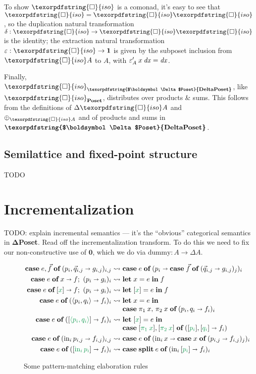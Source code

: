 \documentclass{rntz}\usepackage[a5]{rntzgeometry}\usepackage[fullwidth=130mm,width=330pt,]{narrow}
\newcommand\mathvar[1]{\ensuremath{#1}} %
\renewcommand\mathvar[1]{\ensuremath{\mathit{#1}}} %
\newcommand\todo[1]{{\color{ACMRed}#1}}
\newcommand\isocolor{\color{ForestGreen}} %
\newcommand\cat\textbf
\newcommand\CP{\cat{\texorpdfstring{$\boldsymbol\Delta$Poset}{DeltaPoset}}}
\newcommand\Poset{\cat{Poset}}
\newcommand\D\Delta
\newcommand\injc{\text{in}}
\newcommand\inj[1]{\injc_{#1}\,}
\newcommand\zero{\ensuremath{\mathbold{0}}}
\newcommand\<{\mskip 4mu plus 4mu minus 1mu}
\newcommand\dx{\mathvar{dx}}
\newcommand\iso{{\texorpdfstring{\ensuremath{\square}}{iso}}}
\newcommand\isof{\iso}
\newcommand\fname\text
\newcommand\chgs[1]{\D{#1}}
\newcommand\deriv[1]{\ensuremath{#1'}}
\newcommand\upd{\mathbin{\oplus}}
\newcommand\updfn{\ensuremath{{\upd}}}
\newcommand\kwname\textbf
\newcommand\ecase[1]{\kwname{case} \;{#1}\; \kwname{of}\;}
\newcommand\caseto\shortrightarrow
\newcommand\ebox[1]{[{#1}]}
\newcommand\elet[1]{\kwname{let}\;#1\;\kwname{in}\;}
\newcommand\eboxd[1]{\ebox{\isocolor #1}}
\newcommand\etuple[1]{\langle{#1}\rangle}
\newcommand\splitsum{\kwname{split}\<}
\begin{document}
\noindent
To show $\iso$ is a comonad, it's easy to see that ${\iso} = {\iso\iso}$, so the
duplication natural transformation $\delta : {\iso} \to {\iso\iso}$ is the
identity; the extraction natural transformation $\varepsilon : {\iso} \to
\mathbold{1}$ is given by the subposet inclusion from $\isof A$ to $A$, with
$\deriv{\varepsilon_A} \<x \<\dx = \dx$.

Finally, $\iso_\CP$, like $\iso_\Poset$, distributes over products \& sums. This
follows from the definitions of $\chgs{\iso A}$ and $\updfn_{\iso A}$ and of
products and sums in $\CP$.


\subsection{Semilattice and fixed-point structure}

\todo{TODO}


\section{Incrementalization}
\label{sec:incremental}

\todo{TODO: explain incremental semantics --- it's the ``obvious'' categorical
  semantics in \CP{}. Read off the incrementalization transform. To do this we
  need to fix our non-constructive use of $\zero$, which we do via
  $\fname{dummy} : A \to \chgs A$.}

\newcommand\expandsto{\rightsquigarrow}
\begin{figure*}
  \[\setlength\arraycolsep{.15em}\begin{array}{rcl}
    \ecase{e,\vec f} (p_i, \vec q_{i,j} \caseto g_{i,j})_{i,j}
    &\expandsto& \ecase{e} (p_i \caseto \ecase{\vec f} (\vec q_{i,j} \caseto g_{i,j})_j)_i
    \\[.33em]
    \ecase{e} x \caseto f;\ (p_i \caseto g_i)_i
    &\expandsto& \elet{x = e} f
    \\[.33em]
    \ecase{e} \eboxd x \caseto f;\ (p_i \caseto g_i)_i
    &\expandsto& \elet{\eboxd x = e} f
    \\[.33em]
    \ecase{e} (\etuple{p_i,q_i} \caseto f_i)_i
    &\expandsto& \elet{x = e}\\
    && \ecase{\pi_1\< x,\, \pi_2\< x} (p_i,q_i \caseto f_i)_i
    \\[.33em]
    \ecase{e} (\eboxd{\etuple{p_i,q_i}} \caseto f_i)_i
    &\expandsto& \elet{\eboxd x = e}\\
    && \ecase{\eboxd{\pi_1\<x}, \eboxd{\pi_2\<x}}
    (\eboxd{p_i}, \eboxd{q_i} \caseto f_i)
    \\[.33em]
    \ecase{e} (\inj i p_{i,j} \caseto f_{i,j})_{i,j}
    &\expandsto& \ecase{e} (\inj i x \caseto \ecase{x} (p_{i,j} \caseto f_{i,j})_j)_i
    \\[.33em]
    \ecase{e} (\eboxd{\inj i p_i} \caseto f_i)_i
    &\expandsto& \ecase{\splitsum e} (\inj i \eboxd{p_i} \caseto f_i)_i
  \end{array}\]
  \caption{Some pattern-matching elaboration rules}
\end{figure*}
\end{document}
